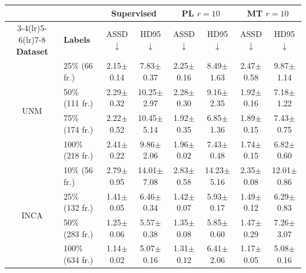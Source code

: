 \documentclass[a4paper,fleqn]{cas-dc}
\begin{document}
\medskip

\noindent
\renewcommand{\thetable}{S4}%
\addtocounter{table}{-1}%
\label{tab:label_eff_boundary}%
\begin{center}
\footnotesize
\begin{tabular}{@{}clcccccc@{}}
\toprule
 & & \multicolumn{2}{c}{\textbf{Supervised}} & \multicolumn{2}{c}{\textbf{PL $r{=}10$}} & \multicolumn{2}{c}{\textbf{MT $r{=}10$}} \\
\cmidrule(lr){3-4}\cmidrule(lr){5-6}\cmidrule(lr){7-8}
\textbf{Dataset} & \textbf{Labels} & ASSD $\downarrow$ & HD95 $\downarrow$ & ASSD $\downarrow$ & HD95 $\downarrow$ & ASSD $\downarrow$ & HD95 $\downarrow$ \\
\midrule
\multirow{4}{*}{UNM}
 & 25\% (66 fr.)   & 2.15$\pm$0.14 & 7.83$\pm$0.37 & 2.25$\pm$0.16 & 8.49$\pm$1.63 & 2.47$\pm$0.58 & 9.87$\pm$1.14 \\
 & 50\% (111 fr.)  & 2.29$\pm$0.32 & 10.25$\pm$2.97 & 2.28$\pm$0.30 & 9.16$\pm$2.35 & 1.92$\pm$0.16 & 7.18$\pm$1.22 \\
 & 75\% (174 fr.)  & 2.22$\pm$0.52 & 10.45$\pm$5.14 & 1.92$\pm$0.35 & 6.85$\pm$1.36 & 1.89$\pm$0.15 & 7.43$\pm$0.75 \\
 & 100\% (218 fr.) & 2.41$\pm$0.22 & 9.86$\pm$2.06 & 1.96$\pm$0.02 & 7.43$\pm$0.48 & 1.74$\pm$0.15 & 6.82$\pm$0.60 \\
\midrule
\multirow{4}{*}{INCA}
 & 10\% (56 fr.)   & 2.79$\pm$0.95 & 14.01$\pm$7.08 & 2.83$\pm$0.58 & 14.23$\pm$5.16 & 2.35$\pm$0.08 & 12.01$\pm$0.86 \\
 & 25\% (132 fr.)  & 1.41$\pm$0.05 & 6.46$\pm$0.34 & 1.42$\pm$0.07 & 5.93$\pm$0.17 & 1.49$\pm$0.12 & 6.29$\pm$0.83 \\
 & 50\% (283 fr.)  & 1.25$\pm$0.06 & 5.57$\pm$0.38 & 1.35$\pm$0.08 & 5.85$\pm$0.60 & 1.47$\pm$0.29 & 7.26$\pm$3.07 \\
 & 100\% (634 fr.) & 1.14$\pm$0.02 & 5.07$\pm$0.16 & 1.31$\pm$0.12 & 6.41$\pm$2.06 & 1.17$\pm$0.05 & 5.08$\pm$0.16 \\
\bottomrule
\end{tabular}
\end{center}


\medskip
\end{document}
